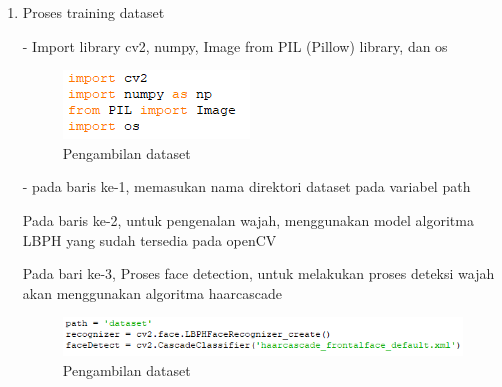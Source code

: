 \begin{enumerate}[1.]
\item Proses training dataset

- Import library cv2, numpy, Image from PIL (Pillow) library, dan os
\begin{figure}[h!]
    \centering
    \includegraphics[width=0.4\linewidth]{images/train_1.PNG}
    \caption{Pengambilan dataset}
\end{figure}

- pada baris ke-1, memasukan nama direktori dataset pada variabel path 

Pada baris ke-2, untuk pengenalan wajah, menggunakan model algoritma LBPH yang sudah tersedia pada openCV

Pada bari ke-3,  Proses face detection, untuk melakukan proses deteksi wajah akan menggunakan algoritma haarcascade
\begin{figure}[h!]
    \centering
    \includegraphics[width=0.9\linewidth]{images/train_2.PNG}
    \caption{Pengambilan dataset}
\end{figure}


\end{enumerate}
